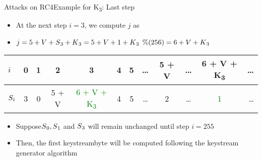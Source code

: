 \documentclass[
	aspectratio=169,	%
	onlytextwidth,		%
	t,					%
	]{beamer}
\begin{document}
\begin{frame}[fragile]{Attacks on RC4}{Example for K\textsubscript{3}: Last step}

	
	\begin{itemize}
		\item At the next step $i = 3$, we compute $j$ as
		\item $j = 5 + V + S\textsubscript{3} + K\textsubscript{3} = 5 + V + 1 + K\textsubscript{3}$ $\%(256) = 6 + V + K\textsubscript{3}$
	\end{itemize}
	
	\begin{table}[h!]
		\begin{center}
			\begin{tabular}{l|c|c|c|c|c|c|c|c|c|c|r}
			$i$ & 0 & 1 & 2 & 3 & 4 & 5 & \dots & 5 + V & \dots & 6 + V + K\textsubscript{3} & \dots\\
			\hline
			$S\textsubscript{i}$ & 3 & 0 & 5 + V & \textcolor{green}{6 + V + K\textsubscript{3}} & 4 & 5 & \dots & 2 & \dots & \textcolor{green}{1} & \dots\\
			\end{tabular}
		\end{center}
	\end{table}

	\begin{itemize}
		\item Suppose$ S\textsubscript{0}, S\textsubscript{1}$ and $S\textsubscript{3}$ will remain unchanged until step $i = 255$
		\item Then, the first keystreambyte will be computed following the keystream generator algorithm
	\end{itemize}

\end{frame}
\end{document}
